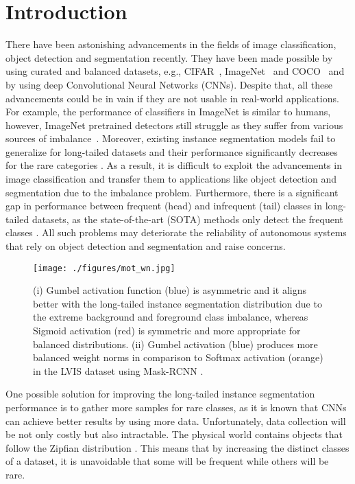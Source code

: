 \documentclass[runningheads]{llncs}
\begin{document}
\section{Introduction}
\label{sec:intro}

There have been astonishing advancements in the fields of image classification, object detection and segmentation recently. They have been made possible by using curated and balanced datasets, e.g.,  CIFAR~\cite{krizhevsky2009learning}, ImageNet~\cite{deng2009imagenet} and COCO~\cite{lin2014microsoft} and by using deep Convolutional Neural Networks (CNNs). Despite that, all these advancements could be in vain if they are not usable in real-world applications. For example, the performance of classifiers in ImageNet is similar to humans, however, ImageNet pretrained detectors still struggle as they suffer from various sources of imbalance~\cite{oksuz2020imbalance}. Moreover, existing instance segmentation models \cite{he2017mask,cai2019cascade,chen2019hybrid} fail to generalize for long-tailed datasets and their performance significantly decreases for the rare categories \cite{gupta2019lvis}. As a result, it is difficult to exploit the advancements in image classification and transfer them to applications like object detection and segmentation due to the imbalance problem. Furthermore, there is a significant gap in performance between frequent (head) and infrequent (tail) classes in long-tailed datasets, as the state-of-the-art (SOTA) methods only detect the frequent classes \cite{wang2020devil,li2020overcoming}. All such problems may deteriorate the reliability of autonomous systems that rely on object detection and segmentation and raise concerns. 



\begin{figure}[t]
\centering
\texttt{[image: ./figures/mot\_wn.jpg]}
\caption{(i) Gumbel activation function (blue) is asymmetric and it aligns better with the long-tailed instance segmentation distribution due to the extreme background and foreground class imbalance, whereas Sigmoid activation (red) is symmetric and more appropriate for balanced distributions. (ii) Gumbel activation (blue) produces more balanced weight norms in comparison to Softmax activation (orange) in the LVIS \cite{gupta2019lvis} dataset using Mask-RCNN \cite{he2017mask}.}
\label{fig:mot_wn}
\end{figure}


One possible solution for improving the long-tailed instance segmentation performance is to gather more samples for rare classes, as it is known that CNNs can achieve better results by using more data. Unfortunately, data collection will be not only costly but also intractable. The physical world contains objects that follow the Zipfian distribution \cite{liu2019large}. This means that by increasing the distinct classes of a dataset, it is unavoidable that some will be frequent while others will be rare. 
\end{document}
